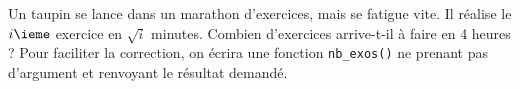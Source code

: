 \exer{}
\setcounter{numques}{0}

\question{} Un taupin se lance dans un marathon d'exercices, mais se fatigue vite. Il réalise le $i\ieme$ exercice en $\sqrt{i}$ minutes. Combien d'exercices arrive-t-il à faire en 4 heures ? 
Pour faciliter la correction, on écrira une fonction \texttt{nb\_exos()} ne prenant pas d'argument et renvoyant le résultat demandé.
